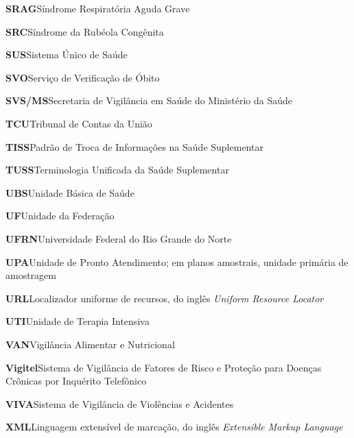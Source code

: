 \noindent\textbf{SRAG}\hspace{1em}Síndrome Respiratória Aguda Grave\par\smallskip
\noindent\textbf{SRC}\hspace{1em}Síndrome da Rubéola Congênita\par\smallskip
\noindent\textbf{SUS}\hspace{1em}Sistema Único de Saúde\par\smallskip
\noindent\textbf{SVO}\hspace{1em}Serviço de Verificação de Óbito\par\smallskip
\noindent\textbf{SVS/MS}\hspace{1em}Secretaria de Vigilância em Saúde do Ministério da Saúde\par\smallskip
\noindent\textbf{TCU}\hspace{1em}Tribunal de Contas da União\par\smallskip
\noindent\textbf{TISS}\hspace{1em}Padrão de Troca de Informações na Saúde Suplementar\par\smallskip
\noindent\textbf{TUSS}\hspace{1em}Terminologia Unificada da Saúde Suplementar\par\smallskip
\noindent\textbf{UBS}\hspace{1em}Unidade Básica de Saúde\par\smallskip
\noindent\textbf{UF}\hspace{1em}Unidade da Federação\par\smallskip
\noindent\textbf{UFRN}\hspace{1em}Universidade Federal do Rio Grande do Norte\par\smallskip
\noindent\textbf{UPA}\hspace{1em}Unidade de Pronto Atendimento; em planos amostrais, unidade primária de amostragem\par\smallskip
\noindent\textbf{URL}\hspace{1em}Localizador uniforme de recursos, do inglês \emph{Uniform Resource Locator}\par\smallskip
\noindent\textbf{UTI}\hspace{1em}Unidade de Terapia Intensiva\par\smallskip
\noindent\textbf{VAN}\hspace{1em}Vigilância Alimentar e Nutricional\par\smallskip
\noindent\textbf{Vigitel}\hspace{1em}Sistema de Vigilância de Fatores de Risco e Proteção para Doenças Crônicas por Inquérito Telefônico\par\smallskip
\noindent\textbf{VIVA}\hspace{1em}Sistema de Vigilância de Violências e Acidentes\par\smallskip
\noindent\textbf{XML}\hspace{1em}Linguagem extensível de marcação, do inglês \emph{Extensible Markup Language}\par\smallskip
\endgroup
\clearpage
